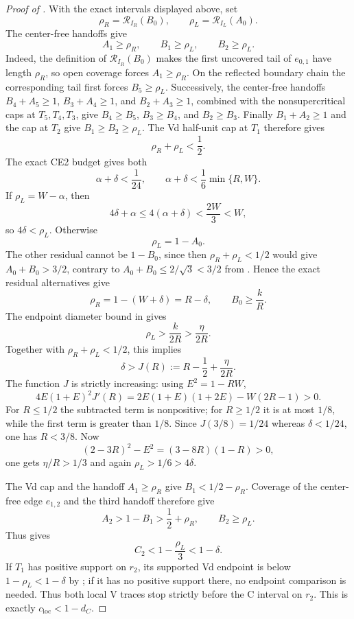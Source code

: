 \begin{proof}[Proof of ]
With the exact intervals displayed above, set
\[
 \rho_R=\mathcal R_{I_R}(B_0),
 \qquad \rho_L=\mathcal R_{I_L}(A_0).
\]
The center-free handoffs give
\[
 A_1\ge\rho_R,
 \qquad B_1\ge\rho_L,
 \qquad B_2\ge\rho_L.
\]
Indeed, the definition of $\mathcal R_{I_R}(B_0)$ makes the first uncovered
tail of $e_{0,1}$ have length $\rho_R$, so open coverage forces
$A_1\ge\rho_R$.  On the reflected boundary chain the corresponding tail
first forces $B_5\ge\rho_L$.  Successively, the center-free handoffs
$B_4+A_5\ge1$, $B_3+A_4\ge1$, and $B_2+A_3\ge1$, combined with the
nonsupercritical caps at $T_5,T_4,T_3$, give
$B_4\ge B_5$, $B_3\ge B_4$, and $B_2\ge B_3$.  Finally
$B_1+A_2\ge1$ and the cap at $T_2$ give $B_1\ge B_2\ge\rho_L$.
The Vd half-unit cap at $T_1$ therefore gives
\[
 \rho_R+\rho_L<\frac12.
\]
The exact CE2 budget  gives both
\[
 \alpha+\delta<\frac1{24},
 \qquad \alpha+\delta<\frac16\min\{R,W\}.
\]
If $\rho_L=W-\alpha$, then
\[
 4\delta+\alpha\le4(\alpha+\delta)<\frac{2W}{3}<W,
\]
so $4\delta<\rho_L$.  Otherwise
\[
 \rho_L=1-A_0.
\]
The other residual cannot be $1-B_0$, since then
$\rho_R+\rho_L<1/2$ would give $A_0+B_0>3/2$, contrary to
$A_0+B_0\le2/\sqrt3<3/2$ from
.  Hence the exact residual alternatives give
\[
 \rho_R=1-(W+\delta)=R-\delta,
 \qquad B_0\ge\frac{k}{R}.
\]
The endpoint diameter bound in  gives
\[
 \rho_L>\frac{k}{2R}>\frac\eta{2R}.
\]
Together with $\rho_R+\rho_L<1/2$, this implies
\[
 \delta>J(R):=R-\frac12+\frac{\eta}{2R}.
\]
The function $J$ is strictly increasing: using $E^2=1-RW$,
\[
 4E(1+E)^2J'(R)
 =2E(1+E)(1+2E)-W(2R-1)>0.
\]
For $R\le1/2$ the subtracted term is nonpositive; for $R\ge1/2$ it is at
most $1/8$, while the first term is greater than $1/8$.
Since $J(3/8)=1/24$ whereas $\delta<1/24$, one has $R<3/8$.  Now
\[
 (2-3R)^2-E^2=(3-8R)(1-R)>0,
\]
one gets $\eta/R>1/3$ and again $\rho_L>1/6>4\delta$.

The Vd cap and the handoff $A_1\ge\rho_R$ give
$B_1<1/2-\rho_R$.  Coverage of the center-free edge $e_{1,2}$ and the third
handoff therefore give
\[
 A_2>1-B_1>\frac12+\rho_R,
 \qquad B_2\ge\rho_L.
\]
Thus
 gives
\[
 C_2<1-\frac{\rho_L}{3}<1-\delta.
\]
If $T_1$ has positive support on $r_2$, its supported Vd endpoint is below
$1-\rho_L<1-\delta$ by ; if it has no
positive support there, no endpoint comparison is needed.  Thus both local V
traces stop strictly before the C interval on $r_2$.  This is exactly
$c_{\mathrm{loc}}<1-d_C$.
\end{proof}

